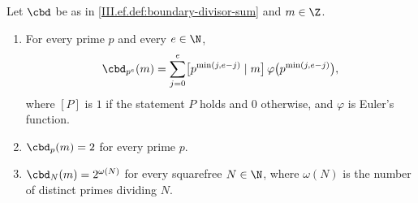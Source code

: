 Let $\cbd$ be as in \cref{III.ef.def:boundary-divisor-sum} and $m\in\Z$.
\begin{enumerate}[label=(\alph*)]
\item For every prime $p$ and every $e\in\N$,
  \[
    \cbd_{p^e}(m)=\sum_{j=0}^{e}\bigl[p^{\min(j,e-j)}\mid m\bigr]\,\varphi\bigl(p^{\min(j,e-j)}\bigr),
  \]
  where $[P]$ is $1$ if the statement $P$ holds and $0$ otherwise, and $\varphi$ is Euler's function.
\item $\cbd_p(m)=2$ for every prime $p$.
\item $\cbd_N(m)=2^{\omega(N)}$ for every squarefree $N\in\N$, where $\omega(N)$ is the number of distinct primes dividing $N$.
\end{enumerate}
